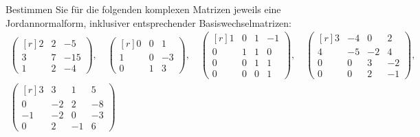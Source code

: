 \begin{question}
  Bestimmen Sie für die folgenden komplexen Matrizen jeweils eine Jordannormalform, inklusiver entsprechender Basiswechselmatrizen:
  \begin{gather*}
    \begin{pmatrix*}[r]
      2 & 2 &  -5 \\
      3 & 7 & -15 \\
      1 & 2 &  -4
    \end{pmatrix*},
    \quad
    \begin{pmatrix*}[r]
      0 & 0 &  1 \\
      1 & 0 & -3 \\
      0 & 1 &  3
    \end{pmatrix*},
    \quad
    \begin{pmatrix*}[r]
      1 & 0 & 1 & -1  \\
      0 & 1 & 1 &  0  \\
      0 & 0 & 1 &  1  \\
      0 & 0 & 0 &  1
    \end{pmatrix*},
    \quad
    \begin{pmatrix*}[r]
      3 & -4  &  0  &  2  \\
      4 & -5  & -2  &  4  \\
      0 &  0  &  3  & -2  \\
      0 &  0  &  2  & -1
    \end{pmatrix*},
  \\
    \begin{pmatrix*}[r]
       3  &  3  &  1  &  5  \\
       0  & -2  &  2  & -8  \\
      -1  & -2  &  0  & -3  \\
       0  &  2  & -1  &  6
    \end{pmatrix*}
  \end{gather*}
\end{question}
